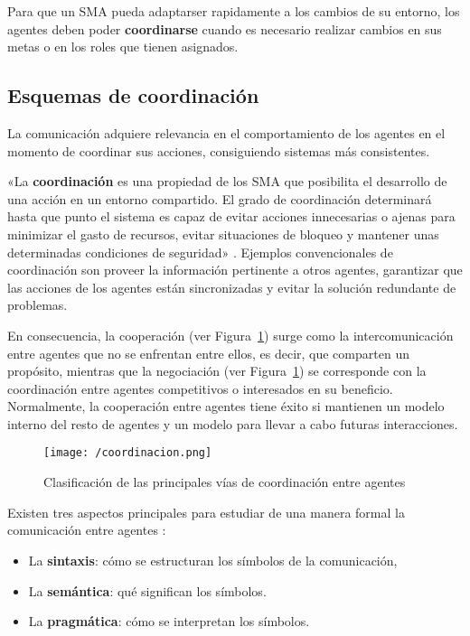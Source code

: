 Para que un \acs{SMA} pueda adaptarser rapidamente a los cambios de su entorno, los agentes deben poder \textbf{coordinarse} cuando es necesario realizar cambios en sus metas o en los roles que tienen asignados.

\subsection{Esquemas de coordinación}
\label{sec:esquemascoordinacion}

La comunicación adquiere relevancia en el comportamiento de los agentes en el momento de coordinar sus acciones, consiguiendo sistemas más consistentes. 

«La \textbf{coordinación} es una propiedad de los \acs{SMA} que posibilita el desarrollo de una acción en un entorno compartido. El grado de coordinación determinará hasta que punto el sistema es capaz de evitar acciones innecesarias o ajenas para minimizar el gasto de recursos, evitar situaciones de bloqueo y mantener unas determinadas condiciones de seguridad» \cite{coordinacion}. Ejemplos convencionales de coordinación son proveer la información pertinente a otros agentes, garantizar que las acciones de los agentes están sincronizadas y evitar la solución redundante de problemas.

En consecuencia, la cooperación (ver Figura~\ref{fig:coordinacion}) surge como la intercomunicación entre agentes que no se enfrentan entre ellos, es decir, que comparten un propósito, mientras que la negociación (ver Figura~\ref{fig:coordinacion}) se corresponde con la coordinación entre agentes competitivos o interesados en su beneficio. Normalmente, la cooperación entre agentes tiene éxito si mantienen un modelo interno del resto de agentes y un modelo para llevar a cabo futuras interacciones.

\begin{figure}[!h]
\begin{center}
\texttt{[image: /coordinacion.png]}
\caption[Clasificación de las principales vías de coordinación entre agentes]{Clasificación de las principales vías de coordinación entre agentes \cite{coordinacion2}}
\label{fig:coordinacion}
\end{center}
\end{figure}

Existen tres aspectos principales para estudiar de una manera formal la comunicación entre agentes \cite{coordinacion}: 
\begin{itemize}
\item La \textbf{sintaxis}: cómo se estructuran los símbolos de la comunicación,
\item La \textbf{semántica}: qué significan los símbolos.
\item La \textbf{pragmática}: cómo se interpretan los símbolos.
\end{itemize}


